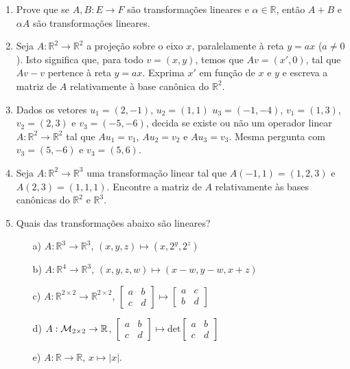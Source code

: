 \documentclass[12pt]{article}
\begin{document}
\begin{enumerate}
\item Prove que se $A,B : E\rightarrow F$ são transformações lineares e $\alpha \in {\mathbb{R}}$, então $A+B$ e $\alpha A$ são transformações lineares.

\item Seja $A:{\mathbb{R}}^2 \rightarrow {\mathbb{R}}^2$ a projeção sobre o eixo $x$, paralelamente à reta $y=ax$ ($a\ne 0$). Isto significa que, para todo $v=(x,y)$, temos que $Av = (x',0)$, tal que $Av-v$ pertence à reta $y=ax$. Exprima $x'$ em função de $x$ e $y$ e escreva a matriz de $A$ relativamente à base canônica do ${\mathbb{R}}^2$.

\item Dados os vetores $u_1 = (2,-1)$, $u_2 = (1,1)$ $u_3 = (-1, -4)$, $v_1 = (1,3)$, $v_2 = (2,3)$ e $v_3 = (-5,-6)$, decida se existe ou não um operador linear $A:{\mathbb{R}}^2 \rightarrow {\mathbb{R}}^2$ tal que $Au_1 = v_1$, $Au_2 = v_2$ e $Au_3 = v_3$. Mesma pergunta com $v_3 = (5,-6)$ e $v_3 = (5,6)$.

\item Seja $A:{\mathbb{R}}^2 \rightarrow {\mathbb{R}}^3$ uma transformação linear tal que $A(-1,1) = (1,2,3)$ e $A(2,3) = (1,1,1)$. Encontre a matriz de $A$ relativamente às bases canônicas do ${\mathbb{R}}^2$ e ${\mathbb{R}}^3$.

\item Quais das transformações abaixo são lineares?
  \begin{itemize}
  \item[a)] $A:{\mathbb{R}}^3 \rightarrow {\mathbb{R}}^3$, $(x,y,z) \mapsto (x,2^y, 2^z)$
  \item[b)] $A:{\mathbb{R}}^4 \rightarrow {\mathbb{R}}^3$, $(x,y,z,w) \mapsto (x-w, y-w, x+z)$
  \item[c)] $A:{\mathbb{R}}^{2\times 2} \rightarrow {\mathbb{R}}^{2\times 2}$, $\begin{bmatrix} a & b\\c & d\end{bmatrix} \mapsto \begin{bmatrix} a & c\\b & d\end{bmatrix}$
  \item[d)] $A:{\cal{M}}_{2\times 2} \to {\mathbb{R}}$, $\begin{bmatrix} a & b\\c & d\end{bmatrix} \mapsto \text{det}\begin{bmatrix} a & b \\c & d\end{bmatrix}$
  \item[e)] $A:{\mathbb{R}} \to {\mathbb{R}}$, $x\mapsto |x|$.
  \end{itemize}


\end{enumerate}
\end{document}
